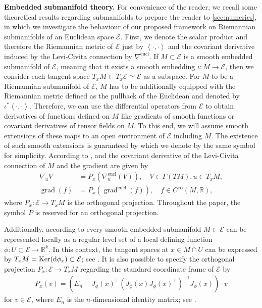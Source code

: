 \documentclass[11pt,a4paper]{article}
\theoremstyle{plain}
\theoremstyle{definition}
\newcommand{\RR}{\mathbb{R}}
\DeclareMathOperator{\grad}{grad}
\DeclareMathOperator{\Ker}{Ker}
\newcommand{\eucl}{\operatorname{eucl}}
\begin{document}
\textbf{Embedded submanifold theory.}
For convenience of the reader, we recall some theoretical results regarding submanifolds to prepare the reader to \cref{sec:numerics}, in which we investigate the behaviour of our proposed framework on Riemannian submanifolds of an Euclidean space $\mathcal{E}$. First, we denote the scalar product and therefore the Riemannian metric of $\mathcal{E}$ just by $\left<\cdot, \cdot\right>$ and the covariant derivative induced by the Levi-Civita connection by $\nabla^{\eucl}$. If $M\subset \mathcal{E}$ is a smooth embedded submanifold of $\mathcal{E}$, meaning that it exists a smooth embedding $\iota\colon M\to \mathcal{E}$, then we consider each tangent space $T_xM\subset T_x\mathcal{E}\simeq \mathcal{E}$ as a subspace. For $M$ to be a Riemannian submanifold of $\mathcal{E}$, $M$ has to be additionally equipped with the Riemannian metric defined as the pullback of the Euclidean and denoted by $\iota^*\left<\cdot, \cdot \right>$. Therefore, we can use the differential operators from $\mathcal{E}$ to obtain derivatives of functions defined on $M$ like gradients of smooth functions or covariant derivatives of tensor fields on $M$. To this end, we will assume smooth extensions of these maps to an open environment of $\mathcal{E}$ including $M$. The existence of such smooth extensions is guaranteed by \cite[Lem.~5.34, p.~115]{lee2012} which we denote by the same symbol for simplicity. According to \cite[Eq.~(5. 4), p.~87]{boumal2023}, \cite[Thm.~5.9, p.~92]{boumal2023} and \cite[Prop.~3.61, p.~44]{boumal2023} the covariant derivative of the Levi-Civita connection of $M$ and the gradient are given by
\begin{align}
	\nabla_u V &= P_x(\nabla_u^{\eucl}(V)),
	\quad
	V\in\Gamma(TM), u\in T_xM,
	\label{eq: embedded covariant derivative}\\
	\grad(f) &= P_x(\grad^{\eucl}(f)), 
	\quad
	f\in C^{\infty}(M, \RR),
	\label{eq: general embedded gradient}
\end{align}
where $P_x\colon \mathcal{E}\to T_xM$ is the orthogonal projection. Throughout the paper, the symbol $P$ is reserved for an orthogonal projection. 

Additionally, according to \cite[Prop.~5.16, p.~106]{lee2012} every smooth embedded submanifold $M\subset\mathcal{E}$ can  be represented locally as a regular level set of a local defining function $\phi\colon U\subset\mathcal{E}\to \RR^{k}$. In this context, the tangent spaces at $x\in M\cap U$ can be expressed by $T_xM = \Ker(\textup{d}\phi_x)\subset\mathcal{E}$; see \cite[Prop.~5.38, p.~117]{lee2012}. It is also possible to specify the orthogonal projection $P_x\colon\mathcal{E}\to T_xM$ regarding the standard coordinate frame of $\mathcal{E}$ by 
\begin{align}
	\label{map: coordinate projection}
	P_x(v) = \left(E_n - J_{\phi}(x)^{\top}(J_{\phi}(x)J_{\phi}(x)^{\top})^{-1}J_{\phi}(x)\right)\cdot v
\end{align}
 for $v\in \mathcal{E}$, where $E_n$ is the $n$-dimensional identity matrix; see \cite[Eq.~(5.13.3), p.~430]{meyer2023}.
\end{document}
